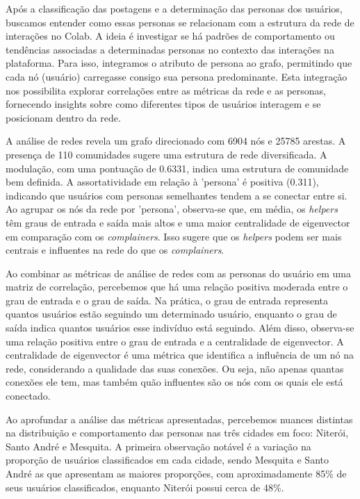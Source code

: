 Após a classificação das postagens e a determinação das personas dos usuários, buscamos entender como essas personas se relacionam com a estrutura da rede de interações no Colab. A ideia é investigar se há padrões de comportamento ou tendências associadas a determinadas personas no contexto das interações na plataforma. Para isso, integramos o atributo de persona ao grafo, permitindo que cada nó (usuário) carregasse consigo sua persona predominante. Esta integração nos possibilita explorar correlações entre as métricas da rede e as personas, fornecendo insights sobre como diferentes tipos de usuários interagem e se posicionam dentro da rede.

A análise de redes revela um grafo direcionado com 6904 nós e 25785 arestas. A presença de 110 comunidades sugere uma estrutura de rede diversificada. A modulação, com uma pontuação de 0.6331, indica uma estrutura de comunidade bem definida. A assortatividade em relação à 'persona' é positiva (0.311), indicando que usuários com personas semelhantes tendem a se conectar entre si. Ao agrupar os nós da rede por 'persona', observa-se que, em média, os \textit{helpers} têm graus de entrada e saída mais altos e uma maior centralidade de eigenvector em comparação com os \textit{complainers}. Isso sugere que os \textit{helpers} podem ser mais centrais e influentes na rede do que os \textit{complainers}.

Ao combinar as métricas de análise de redes com as personas do usuário em uma matriz de correlação, percebemos que há uma relação positiva moderada entre o grau de entrada e o grau de saída. Na prática, o grau de entrada representa quantos usuários estão seguindo um determinado usuário, enquanto o grau de saída indica quantos usuários esse indivíduo está seguindo. Além disso, observa-se uma relação positiva entre o grau de entrada e a centralidade de eigenvector. A centralidade de eigenvector é uma métrica que identifica a influência de um nó na rede, considerando a qualidade das suas conexões. Ou seja, não apenas quantas conexões ele tem, mas também quão influentes são os nós com os quais ele está conectado.

Ao aprofundar a análise das métricas apresentadas, percebemos nuances distintas na distribuição e comportamento das personas nas três cidades em foco: Niterói, Santo André e Mesquita. A primeira observação notável é a variação na proporção de usuários classificados em cada cidade, sendo Mesquita e Santo André as que apresentam as maiores proporções, com aproximadamente 85\% de seus usuários classificados, enquanto Niterói possui cerca de 48\%.

